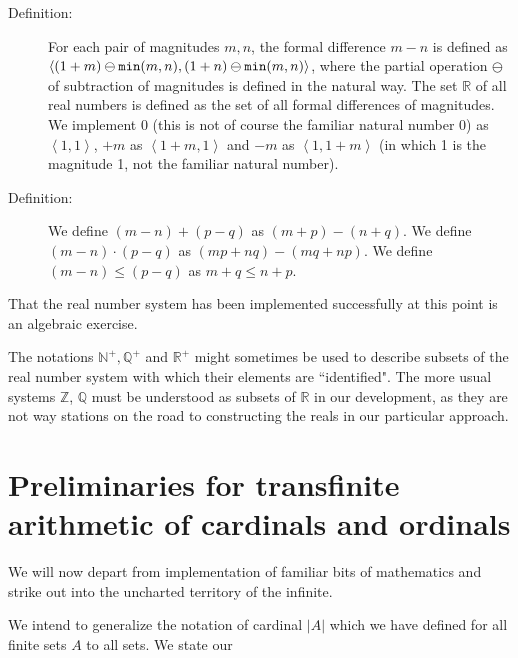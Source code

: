 \documentclass[12pt]{book}
\begin{document}
\begin{description}

\item[Definition:]  For each pair of magnitudes $m,n$, the formal difference $m-n$ is defined as $\left<(1+m)\ominus {\tt min}(m,n),(1+n)\ominus {\tt min}(m,n)\right>$, where the partial operation $\ominus$ of subtraction of magnitudes is defined in the natural way.  The set $\mathbb R$ of all real numbers is defined as the set of all formal differences of magnitudes.  We implement 0 (this is not of course the familiar natural number 0)
as $\left<1,1\right>$, $+m$ as $\left<1+m,1\right>$ and $-m$ as $\left<1,1+m\right>$ (in which 1 is the magnitude 1, not the familiar natural number).

\item[Definition:]  We define $(m-n)+(p-q)$ as $(m+p) -(n+q)$.  We define $(m-n)\cdot (p-q)$ as $(mp+nq) - (mq+np)$.  We define $(m-n) \leq (p-q)$ as $m+q \leq n+p$.

\end{description}

That the real number system has been implemented successfully at this point is an algebraic exercise.

The notations ${\mathbb N}^+, {\mathbb Q}^+$ and ${\mathbb R}^+$ might sometimes be used to describe subsets of the real number system with which their elements are ``identified".  The more usual systems $\mathbb Z$, $\mathbb Q$ must be understood as subsets of $\mathbb R$ in our development, as they are not way stations on the road to constructing the reals in our particular approach.

\newpage

\section{\small Preliminaries for transfinite arithmetic of cardinals and ordinals}

We will now depart from implementation of familiar bits of mathematics and strike out into the uncharted territory of the infinite.

We intend to generalize the notation of cardinal $|A|$ which we have defined for all finite sets $A$ to all sets.  We state our
\end{document}
